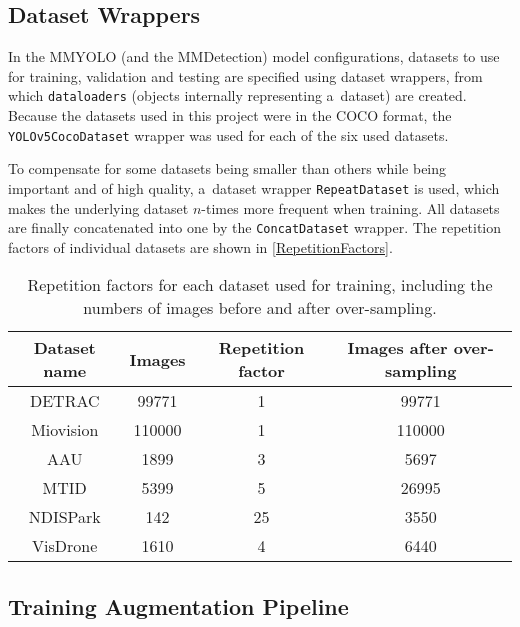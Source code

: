\subsection{Dataset Wrappers}

In the MMYOLO (and the MMDetection) model configurations, datasets to use for
training, validation and testing are specified using dataset wrappers, from
which \texttt{dataloaders} (objects internally representing a~dataset) are
created. Because the datasets used in this project were in the COCO format, the
\texttt{YOLOv5CocoDataset} wrapper was used for each of the six used datasets.

To compensate for some datasets being smaller than others while being important
and of high quality, a~dataset wrapper \texttt{RepeatDataset} is used, which
makes the underlying dataset $n$-times more frequent when training. All datasets are finally
concatenated into one by the \texttt{ConcatDataset} wrapper. The repetition
factors of individual datasets are shown in \autoref{RepetitionFactors}.

\begin{table}[t]
    \centering
    \small
    \begin{threeparttable}
        \begin{tabular}{|c|c|c|c|}
            \hline
            Dataset name & Images & Repetition factor & Images after over-sampling \\
            \hline
            DETRAC       &  \num{99771} &  1 & \num{99771} \\
            Miovision    & \num{110000} &  1 & \num{110000} \\
            AAU          &   \num{1899} &  3 & \num{5697} \\
            MTID         &   \num{5399} &  5 & \num{26995} \\
            NDISPark     &    \num{142} & 25 & \num{3550} \\
            VisDrone     &   \num{1610} &  4 & \num{6440} \\
            \hline
        \end{tabular}
        \caption{Repetition factors for each dataset used for training, including the
        numbers of images before and after over-sampling.}
        \label{RepetitionFactors}
    \end{threeparttable}
\end{table}



\subsection{Training Augmentation Pipeline}

